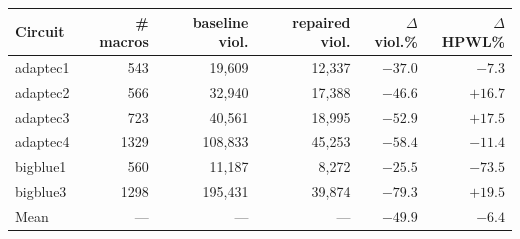 \begin{tabular}{lrrrrr}
\toprule
Circuit & \# macros & baseline viol. & repaired viol. & $\Delta$viol.\% & $\Delta$HPWL\% \\
\midrule
adaptec1 & 543 & 19,609 & 12,337 & $-37.0$ & $-7.3$ \\
adaptec2 & 566 & 32,940 & 17,388 & $-46.6$ & $+16.7$ \\
adaptec3 & 723 & 40,561 & 18,995 & $-52.9$ & $+17.5$ \\
adaptec4 & 1329 & 108,833 & 45,253 & $-58.4$ & $-11.4$ \\
bigblue1 & 560 & 11,187 & 8,272 & $-25.5$ & $-73.5$ \\
bigblue3 & 1298 & 195,431 & 39,874 & $-79.3$ & $+19.5$ \\
\midrule
Mean & --- & --- & --- & $-49.9$ & $-6.4$ \\
\bottomrule
\end{tabular}